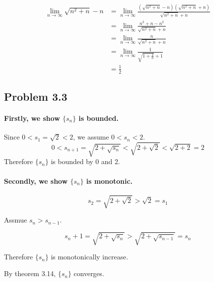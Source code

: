 \documentclass{article}
\begin{document}
\begin{equation}
  \begin{split}
    \lim_{n \rightarrow \infty}  \sqrt{n^2 + n} - n & = \lim_{n \rightarrow \infty} \frac{(\sqrt{n^2 + n} - n)(\sqrt{n^2 + n} + n)}{\sqrt{n^2 + n} + n} \\
    & = \lim_{n \rightarrow \infty} \frac{n^2 + n - n^2}{\sqrt{n^2 + n} + n} \\
    & = \lim_{n \rightarrow \infty} \frac{ n }{\sqrt{n^2 + n} + n} \\
    & = \lim_{n \rightarrow \infty} \frac{ 1 }{\sqrt{1 + \frac{1}{n}} + 1} \\
    & = \frac{1}{2}
  \end{split}
\end{equation}

\subsection*{Problem 3.3}
\paragraph{ Firstly, we show $ \{s_n\}$ is bounded. }

Since $0 < s_1 = \sqrt{2} < 2$, we assume $ 0< s_n < 2$. $$ 0 < s_{n+1} = \sqrt{2 + \sqrt{s_n}} < \sqrt{2 + \sqrt{2}} < \sqrt{2 + 2} = 2 $$
Therefore $ \{s_n\}$ is bounded by 0 and 2.

\paragraph{ Secondly, we show $ \{s_n\}$ is monotonic.}

\begin{equation}
  s_2 =  \sqrt{2 + \sqrt{2}} > \sqrt{2} = s_1
\end{equation}

Assmue $s_n > s_{n-1}$.

\begin{equation}
  s_n+1 =  \sqrt{2 + \sqrt{s_n}} > \sqrt{2 + \sqrt{s_{n-1}}} = s_n
\end{equation}

Therefore $ \{s_n\}$ is monotonically increase.

By theorem 3.14, $ \{s_n\}$ converges.
\end{document}
